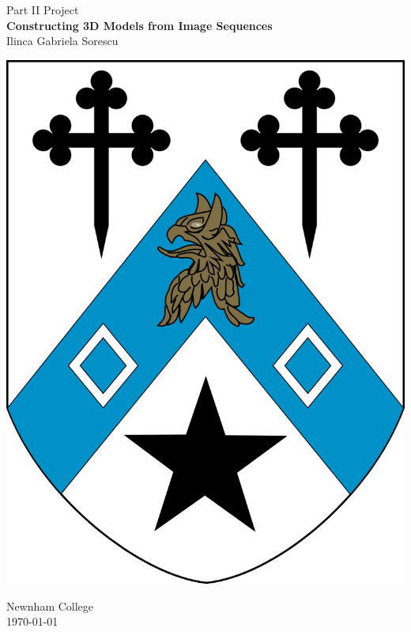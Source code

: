 \documentclass[12pt,a4paper,twoside,openright]{report}
\begin{document}






\pagestyle{empty}


\begin{center}
\begin{Huge}
Part II Project\\
\textbf{Constructing 3D Models from Image Sequences} \\[5mm]
Ilinca Gabriela Sorescu \\
\end{Huge}
\vspace*{10mm}
\centerline{\includegraphics[scale=0.2]{figs/Newnham_crest.png}}
\Large Newnham College \\
\vspace*{65mm}
\large \today %
\end{center}
\end{document}
